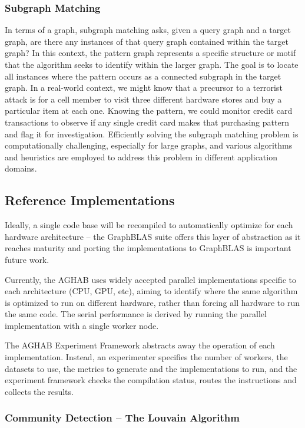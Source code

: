     \subsubsection{Subgraph Matching}
        In terms of a graph, subgraph matching asks, given a query graph and a target graph, are there any instances of that query graph contained within the target graph? 
        In this context, the pattern graph represents a specific structure or motif that the algorithm seeks to identify within the larger graph. 
        The goal is to locate all instances where the pattern occurs as a connected subgraph in the target graph. 
        In a real-world context, we might know that a precursor to a terrorist attack is for a cell member to visit three different hardware stores and buy a particular item at each one. 
        Knowing the pattern, we could monitor credit card transactions to observe if any single credit card makes that purchasing pattern and flag it for investigation. 
        Efficiently solving the subgraph matching problem is computationally challenging, especially for large graphs, and various algorithms and heuristics are employed to address this problem in different application domains. 

\subsection{Reference Implementations}

Ideally, a single code base will be recompiled to automatically optimize for each hardware architecture -- the GraphBLAS suite offers this layer of abstraction as it reaches maturity and porting the implementations to GraphBLAS is important future work. 

Currently, the AGHAB uses widely accepted parallel implementations specific to each architecture (CPU, GPU, etc), aiming to identify where the same algorithm is optimized to run on different hardware, rather than forcing all hardware to run the same code.
The serial performance is derived by running the parallel implementation with a single worker node.

The AGHAB Experiment Framework abstracts away the operation of each implementation. 
Instead, an experimenter specifies the number of workers, the datasets to use, the metrics to generate and the implementations to run, and the experiment framework checks the compilation status, routes the instructions and collects the results.

\subsubsection{Community Detection -- The Louvain Algorithm}


